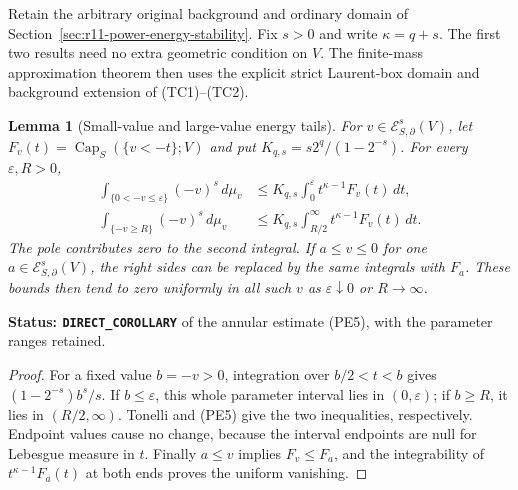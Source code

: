\documentclass[11pt,a4paper]{article}
\numberwithin{equation}{section}
\newtheorem{lemma}[theorem]{Lemma}
\theoremstyle{definition}
\theoremstyle{remark}
\begin{document}
Retain the arbitrary original background and ordinary domain of
Section~\ref{sec:r11-power-energy-stability}. Fix $s>0$ and
write $\kappa=q+s$. The first two results need no extra
geometric condition on $V$. The finite-mass approximation theorem
then uses the explicit strict Laurent-box domain and background
extension of (TC1)--(TC2).

\begin{lemma}[Small-value and large-value energy tails]
\label{lem:r11-two-sided-energy-tails}
For $v\in\mathcal E^s_{S,\partial}(V)$, let
$F_v(t)=\operatorname{Cap}_S(\{v<-t\};V)$ and put
$K_{q,s}=s2^q/(1-2^{-s})$. For every $\varepsilon,R>0$,
\[
 \begin{split}
 \int_{\{0<-v\leq\varepsilon\}}(-v)^s\,d\mu_v
     &\leq K_{q,s}\int_0^\varepsilon t^{\kappa-1}F_v(t)\,dt,\\
 \int_{\{-v\geq R\}}(-v)^s\,d\mu_v
     &\leq K_{q,s}\int_{R/2}^\infty t^{\kappa-1}F_v(t)\,dt.
 \end{split}
 \tag{BA1}
\]
The pole contributes zero to the second integral. If $a\leq v\leq0$
for one $a\in\mathcal E^s_{S,\partial}(V)$, the right sides
can be replaced by the same integrals with $F_a$. These bounds
then tend to zero uniformly in all such $v$ as
$\varepsilon\downarrow0$ or $R\to\infty$.
\end{lemma}

\noindent\textbf{Status: \texttt{DIRECT\_COROLLARY}} of the
annular estimate (PE5), with the parameter ranges retained.

\begin{proof}
For a fixed value $b=-v>0$, integration over $b/2<t<b$ gives
$(1-2^{-s})b^s/s$. If $b\leq\varepsilon$, this whole
parameter interval lies in $(0,\varepsilon)$; if $b\geq R$,
it lies in $(R/2,\infty)$. Tonelli and (PE5) give the two
inequalities, respectively. Endpoint values cause no change,
because the interval endpoints are null for Lebesgue measure
in $t$. Finally $a\leq v$ implies $F_v\leq F_a$, and the
integrability of $t^{\kappa-1}F_a(t)$ at both ends proves
the uniform vanishing.
\end{proof}
\end{document}
